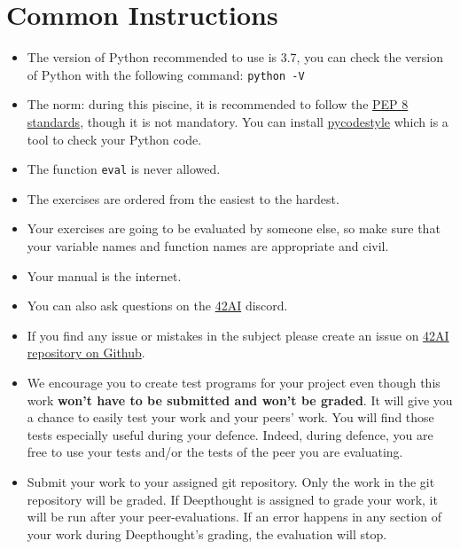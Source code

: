 
\chapter*{Common Instructions}
\begin{itemize}
  \item The version of Python recommended to use is 3.7, you can
  check the version of Python with the following command: \texttt{python -V}
  
  \item The norm: during this piscine, it is recommended to follow the
  \href{https://www.python.org/dev/peps/pep-0008/}{PEP 8 standards}, though it is not mandatory.
  You can install \href{https://pypi.org/project/pycodestyle}{pycodestyle} which
  is a tool to check your Python code.
  
  \item The function \texttt{eval} is never allowed.
  
  \item The exercises are ordered from the easiest to the hardest.
  
  \item Your exercises are going to be evaluated by someone else,
  so make sure that your variable names and function names are appropriate and civil. 
  
  \item Your manual is the internet.
  
  \item You can also ask questions on the \href{https://discord.gg/8Vvb6QMCZq}{42AI} discord.
  
  \item If you find any issue or mistakes in the subject please create an issue on \href{https://github.com/42-AI/bootcamp_python/issues}{42AI repository on Github}.  
  
  \item We encourage you to create test programs for your
  project even though this work \textbf{won't have to be
  submitted and won't be graded}. It will give you a chance
  to easily test your work and your peers’ work. You will find
  those tests especially useful during your defence. Indeed,
  during defence, you are free to use your tests and/or the
  tests of the peer you are evaluating.
  
  \item Submit your work to your assigned git repository. Only the work in the
  git repository will be graded. If Deepthought is assigned to grade your
  work, it will be run after your peer-evaluations.
  If an error happens in any section of your work during Deepthought's grading,
  the evaluation will stop.
\end{itemize}

